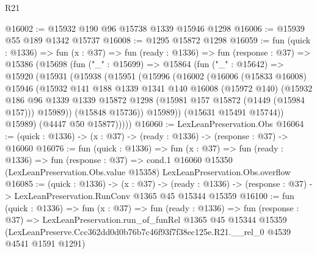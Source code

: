 \begin{lexlean}{R21}
\begin{coremodule}
@16002 := @15932 @190 @96 @15738 @1339 @15946 @1298
@16006 := @15939 @55 @189 @1342 @15737
@16008 := @1295 @15872 @1298
@16059 := fun (quick : @1336) =>
  fun (x : @37) =>
  fun (ready : @1336) =>
  fun (response : @37) =>
  @15386
    (@15698
      (fun ("_" : @15699) =>
      @15864
        (fun ("_" : @15642) =>
        @15920
          (@15931
            (@15938
              (@15951
                (@15996
                  (@16002
                    (@16006
                      (@15833 @16008)
                      @15946
                      (@15932
                        @141
                        @188
                        @1339
                        @1341
                        @140
                        @16008
                        (@15972 @140)
                        (@15932
                          @186
                          @96
                          @1339
                          @1339
                          @15872
                          @1298
                          (@15981 @157 @15872 (@1449 (@15984 @157)))
                          @15989))
                      (@15848 @15736))
                    @15989))
                (@15631 @15491 @15744))
              @15989)
            (@4447 @50 @15877)))))
@16060 := LexLeanPreservation.Obs
@16064 := (quick : @1336) -> (x : @37) -> (ready : @1336) -> (response : @37) -> @16060
@16076 := fun (quick : @1336) =>
  fun (x : @37) =>
  fun (ready : @1336) =>
  fun (response : @37) =>
  cond.{1} @16060 @15350 (LexLeanPreservation.Obs.value @15358) LexLeanPreservation.Obs.overflow
@16085 := (quick : @1336) ->
  (x : @37) ->
  (ready : @1336) -> (response : @37) -> LexLeanPreservation.RunConv @1365 @45 @15344 @15359
@16100 := fun (quick : @1336) =>
  fun (x : @37) =>
  fun (ready : @1336) =>
  fun (response : @37) =>
  LexLeanPreservation.run_of_funRel
    @1365
    @45
    @15344
    @15359
    (LexLeanPreserve.Ccc362dd0d0b76b7c46f93f7f38ec125e.R21.__rel_0 @4539 @4541 @1591 @1291)
\end{coremodule}
\end{lexlean}
